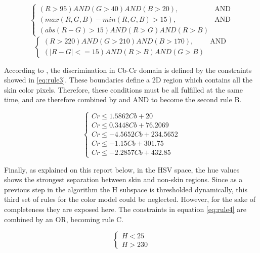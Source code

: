 \begin{equation}
		\begin{cases}
		    (R > 95) AND (G > 40) AND (B > 20),& \text{AND}\\
		    (max(R, G, B) - min(R, G, B) > 15), & \text{AND}\\
		    (abs(R - G) > 15) AND (R > G) AND (R > B)
		\end{cases}
		\label{eq:rule1}
\end{equation}
\begin{equation}
		\begin{cases}
		    (R > 220) AND (G > 210) AND (B > 170),& \text{AND}\\
			(|R - G| <= 15) AND (R > B) AND (G > B)
		\end{cases}
	\label{eq:rule2}
\end{equation}

According to \cite{Ref:SkinDetection}, the discrimination in Cb-Cr domain is defined by the constraints showed in \ref{eq:rule3}.  
These boundaries define a 2D region which contains all the skin color pixels. 
Therefore, these conditions must be all fulfilled at the same time, and are therefore combined by and AND to become the second rule B.

\begin{equation}
		\begin{cases}
			Cr \le 1.5862  Cb + 20         \\
			Cr \le 0.3448  Cb + 76.2069     \\
			Cr \le -4.5652  Cb + 234.5652   \\
			Cr \le -1.15 Cb + 301.75       \\
			Cr \le -2.2857 Cb + 432.85
			\end{cases}
		\label{eq:rule3}
\end{equation}

Finally, as explained on this report below, in the HSV space, the hue values shows the strongest separation between skin and non-skin regions. 
Since as a previous step in the algorithm the H subspace is thresholded dynamically, this third set of rules for the color model could be neglected. However, for the sake of completeness they are exposed here.
The constraints in equation \ref{eq:rule4} are combined by an OR, becoming rule C.

\begin{equation}
		\begin{cases}
			H < 25   \\
			H > 230
		\end{cases}
	\label{eq:rule4}
\end{equation}

